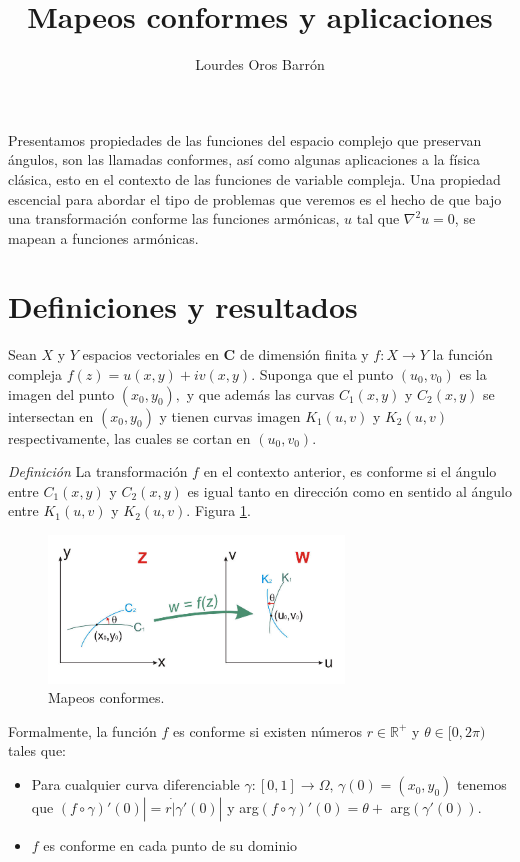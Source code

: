 \documentclass[a4paper]{article}
\title{Mapeos conformes y aplicaciones}
\author{Lourdes Oros Barrón}
\begin{document}
\maketitle

Presentamos propiedades de las funciones del espacio complejo que preservan \'angulos, son las llamadas conformes, así como algunas aplicaciones a la física cl\'asica, esto en el contexto de las funciones de variable compleja. Una propiedad escencial para abordar el tipo de problemas que veremos es el hecho de que bajo una transformación conforme las funciones armónicas, $u$ tal que $\nabla ^{2}u=0$, se mapean a funciones armónicas.

\section{Definiciones y resultados}

Sean $X$ y $Y$ espacios vectoriales en $\mathbf{C}$ de dimensi\'on finita y $f:X \rightarrow Y$ la función compleja $f(z)=u(x,y)+iv(x,y).$ Suponga que el punto $(u_{0}, v_{0})$ es la imagen del punto $(x_{0}, y_{0}),$ y que además las curvas $C_{1}(x, y)$ y $C_{2}(x, y)$ se intersectan en $(x_{0}, y_{0})$ y tienen curvas imagen $K_{1}(u, v)$ y $K_{2}(u, v)$ respectivamente, las cuales se cortan en $(u_{0}, v_{0}).$ 

\textit{Definición} La transformación $f$ en el contexto anterior, es conforme si el ángulo entre $C_{1}(x, y)$ y $C_{2}(x, y)$ es igual tanto en dirección como en sentido al ángulo entre $K_{1}(u, v)$ y $K_{2}(u, v).$ Figura \ref{fig:mapconf}.\\

\begin{figure}
\centering
\includegraphics[width=0.7\textwidth]{mapconf.png}
\caption{\label{fig:mapconf} Mapeos conformes.}
\end{figure}

Formalmente, la función $f$ es conforme si existen números $r \in \mathbb{R}^{+}$ y $\theta \in [0, 2\pi)$ tales que:
\begin{itemize}
    \item Para cualquier curva diferenciable $\gamma : [0,1] \rightarrow \Omega,\, \gamma(0)=(x_{0}, y_{0})$ tenemos que $(f\circ  \gamma)'(0)|=r \dot |\gamma'(0)|$ y arg$(f\circ \gamma)'(0)=\theta +$ arg$(\gamma'(0)).$
    
    \item $f$ es conforme en cada punto de su dominio
\end{itemize}
\end{document}
